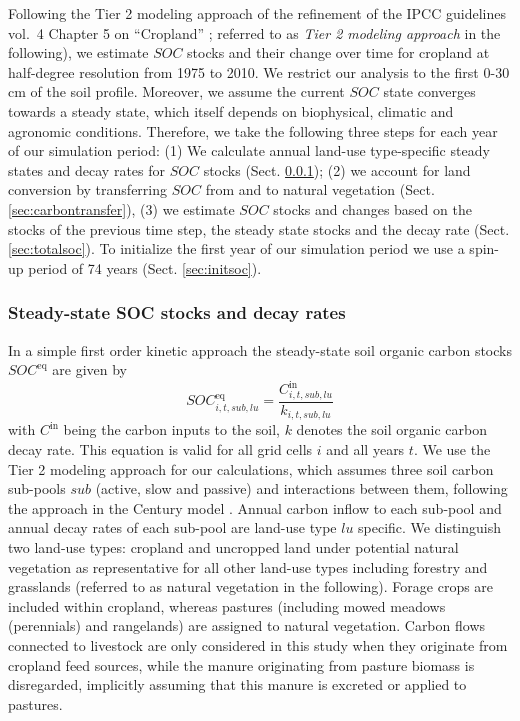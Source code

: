 \documentclass[gc, manuscript]{copernicus}
\begin{document}
Following the Tier 2 modeling approach of the refinement of the IPCC guidelines vol.~4 Chapter 5 on ``Cropland'' \citep{ogle_cropland_in_ipcc_2019}; referred to as \textit{Tier 2 modeling approach} in the following), we estimate \(SOC\) stocks and their change over time for cropland at half-degree resolution from 1975 to 2010. We restrict our analysis to the first 0-30 cm of the soil profile. Moreover, we assume the current \(SOC\) state converges towards a steady state, which itself depends on biophysical, climatic and agronomic conditions.
Therefore, we take the following three steps for each year of our simulation period:
(1) We calculate annual land-use type-specific steady states and decay rates for \(SOC\) stocks (Sect. \ref{sec:steadystates});
(2) we account for land conversion by transferring \(SOC\) from and to natural vegetation (Sect. \ref{sec:carbontransfer}),
(3) we estimate \(SOC\) stocks and changes based on the stocks of the previous time step, the steady state stocks and the decay rate (Sect. \ref{sec:totalsoc}).
To initialize the first year of our simulation period we use a spin-up period of 74 years (Sect. \ref{sec:initsoc}).

\hypertarget{sec:steadystates}{%
\subsubsection{Steady-state SOC stocks and decay rates}\label{sec:steadystates}}

In a simple first order kinetic approach the steady-state soil organic carbon stocks \(SOC^{\mathrm{eq}}\) are given by
\begin{equation}
 SOC^{\mathrm{eq}}_{i,t,sub,lu} =\frac{C^{\mathrm{in}}_{i,t,sub,lu}}{k_{i,t,sub,lu}}
\label{eq:inoutflow}
\end{equation}
with \(C^{\textrm{in}}\) being the carbon inputs to the soil, \(k\) denotes the soil organic carbon decay rate. This equation is valid for all grid cells \(i\) and all years \(t\). We use the Tier 2 modeling approach for our calculations, which assumes three soil carbon sub-pools \(sub\) (active, slow and passive) and interactions between them, following the approach in the Century model \citep{parton_analysis_1987}. Annual carbon inflow to each sub-pool and annual decay rates of each sub-pool are land-use type \(lu\) specific.
We distinguish two land-use types: cropland and uncropped land under potential natural vegetation as representative for all other land-use types including forestry and grasslands (referred to as natural vegetation in the following). Forage crops are included within cropland, whereas pastures (including mowed meadows (perennials) and rangelands) are assigned to natural vegetation. Carbon flows connected to livestock are only considered in this study when they originate from cropland feed sources, while the manure originating from pasture biomass is disregarded, implicitly assuming that this manure is excreted or applied to pastures.
\end{document}
